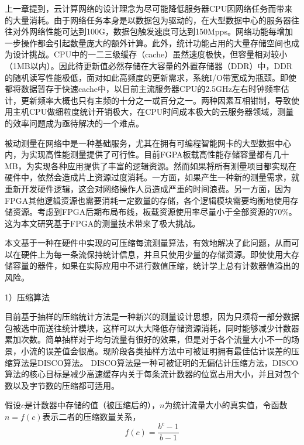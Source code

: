上一章提到，云计算网络的设计理念为尽可能降低服务器CPU因网络任务而带来的大量消耗。由于网络任务本身是以数据包为驱动的，在大型数据中心的服务器往往对外网络性能可达到100G，数据包触发速度可达到150Mpps。网络功能每增加一步操作都会引起数量庞大的额外计算。此外，统计功能占用的大量存储空间也成为设计挑战。CPU中的一二三级缓存（cache）虽然速度极快，但容量相对较小（1MB以内）。因此待更新值必然存储在大容量的外置存储器（DDR）中，DDR的随机读写性能极低，面对如此高频度的更新需求，系统I/O带宽成为瓶颈。即使都将数据暂存于快速cache中，以目前主流服务器CPU的2.5GHz左右时钟频率估计，更新频率大概也只有主频的十分之一或百分之一。两种因素互相钳制，导致使用主机CPU做细粒度统计开销极大，在CPU时间成本极大的云服务器领域，测量的效率问题成为亟待解决的一个难点。

\label{chap352}

被动测量在网络中是一种基础服务，尤其在拥有可编程智能网卡的大型数据中心内，为实现高性能测量提供了可行性。目前FGPA板载高性能存储容量都有几十MB，为实现各种应用提供了丰富的逻辑资源。然而如果将所有测量项目都实现在硬件中，依然会造成片上资源过度消耗。一方面，如果产生一种新的测量需求，就重新开发硬件逻辑，这会对网络操作人员造成严重的时间浪费。另一方面，因为FPGA其他逻辑资源也需要消耗一定数量的存储，各个逻辑模块需要均衡地使用存储资源。考虑到FPGA后期布局布线，板载资源使用率尽量小于全部资源的70\%。这为本文研究基于FPGA的测量技术带来了极大挑战。

本文基于一种在硬件中实现的可压缩每流测量算法，有效地解决了此问题，从而可以在硬件上为每一条流保持统计信息，并且只使用少量的存储资源。即使使用大存储容量的器件，如果在实际应用中不进行数值压缩，统计学上总有计数器值溢出的风险。

\label{chap353}

1）压缩算法

目前基于抽样的压缩统计方法是一种新兴的测量设计思想，因为只须将一部分数据包被选中而送往统计模块，这样可以大大降低存储资源消耗，同时能够减少计数器累加次数。简单抽样对于均匀流量有很好的效果，但是对于各个流量大小不一的场景，小流的误差值会很高。现阶段各类抽样方法中可被证明拥有最佳估计误差的压缩算法是DISCO算法。
DISCO算法是一种可被证明的无偏估计压缩方法，DISCO算法的核心目标是减少高速缓存内关于每条流计数器的位宽占用大小，并且对包个数以及字节数的压缩都可适用。

假设$ c $是计数器中存储的值（被压缩后的），$ n $为统计流量大小的真实值，令函数$ n=f(c) $表示二者的压缩数量关系，
\begin{equation} \label{discofunc}
f(c)=\frac{b^c-1}{b-1}
\end{equation}

